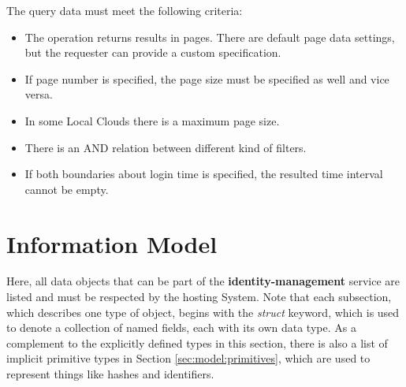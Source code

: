 \documentclass[a4paper]{arrowhead}
\begin{document}


The query data must meet the following criteria:

\begin{itemize}
    \item The operation returns results in pages. There are default page data settings, but the requester can provide a custom specification.
    \item If page number is specified, the page size must be specified as well and vice versa.
    \item In some Local Clouds there is a maximum page size.
    \item There is an AND relation between different kind of filters.
    \item If both boundaries about login time is specified, the resulted time interval cannot be empty.
\end{itemize}


\clearpage

\section{Information Model}
\label{sec:model}

Here, all data objects that can be part of the \textbf{identity-management} service
are listed and must be respected by the hosting System.
Note that each subsection, which describes one type of object, begins with the \textit{struct} keyword, which is used to denote a collection of named fields, each with its own data type.
As a complement to the explicitly defined types in this section, there is also a list of implicit primitive types in Section \ref{sec:model:primitives}, which are used to represent things like hashes and identifiers.

{}
\end{document}
